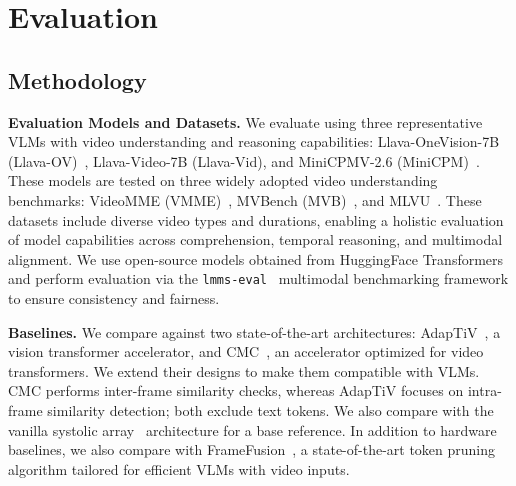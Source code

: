 \section{Evaluation}
\label{sec:eval}
\subsection{Methodology}

\textbf{Evaluation Models and Datasets.}
We evaluate \proj using three representative VLMs with video understanding and reasoning capabilities: Llava-OneVision-7B (Llava-OV)~\cite{li2024llava}, Llava-Video-7B (Llava-Vid)\cite{zhang2024video}, and MiniCPMV-2.6 (MiniCPM)~\cite{yao2024minicpm}. These models are tested on three widely adopted video understanding benchmarks: VideoMME (VMME)~\cite{fu2025video}, MVBench (MVB)~\cite{li2024mvbench}, and MLVU~\cite{zhou2025mlvu}. These datasets include diverse video types and durations, enabling a holistic evaluation of model capabilities across comprehension, temporal reasoning, and multimodal alignment.
We use open-source models obtained from HuggingFace Transformers~\cite{wolf2020transformers} and perform evaluation via the \texttt{lmms-eval}~\cite{zhang2024lmmsevalrealitycheckevaluation} multimodal benchmarking framework to ensure consistency and fairness.

\textbf{Baselines.}
We compare \proj against two state-of-the-art architectures: AdapTiV~\cite{yoo2024adaptiv}, a vision transformer accelerator, and CMC~\cite{song2024cmc}, an accelerator optimized for video transformers. We extend their designs to make them compatible with VLMs. {CMC performs inter-frame similarity checks, whereas AdapTiV focuses on intra-frame similarity detection; both exclude text tokens.} We also compare with the vanilla systolic array~\cite{kung1979systolic} architecture for a base reference.
In addition to hardware baselines, we also compare with FrameFusion~\cite{fu2024framefusion}, a state-of-the-art token pruning algorithm tailored for efficient VLMs with video inputs. 

